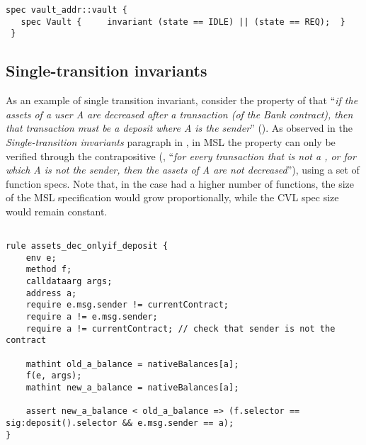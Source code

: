 \begin{lstlisting}[language=move,caption={Specification of \specurl{vault}{state-idle-req-inter} in MSL}]
spec vault_addr::vault {
   spec Vault {     invariant (state == IDLE) || (state == REQ);  }
 }
\end{lstlisting}




\subsection{Single-transition invariants}
\label{sec:appendix:singleTransInv}

As an example of single transition invariant, consider the property of  that ``\emph{if the assets of a user A are decreased after a transaction (of the Bank contract), then that transaction must be a deposit where A is the sender}'' ().
As  observed in the \emph{Single-transition invariants} paragraph in , in MSL the property can only be verified through the contrapositive 
(\ie, ``\emph{for every transaction that is not a , or for which A is
not the sender, then the assets of A are not decreased}''), 
using a set of function specs. 
Note that, in the case  had a higher number of functions, the size of the MSL specification would grow proportionally, while the CVL spec size would remain constant.


\begin{lstlisting}[language=cvl,caption={Specification of \specurl{bank}{assets-dec-onlyif-deposit} in CVL}]

rule assets_dec_onlyif_deposit {
    env e; 
    method f;
    calldataarg args;
    address a;
    require e.msg.sender != currentContract;
    require a != e.msg.sender;
    require a != currentContract; // check that sender is not the contract 
    
    mathint old_a_balance = nativeBalances[a];
    f(e, args);
    mathint new_a_balance = nativeBalances[a];

    assert new_a_balance < old_a_balance => (f.selector == sig:deposit().selector && e.msg.sender == a);
}
\end{lstlisting}


